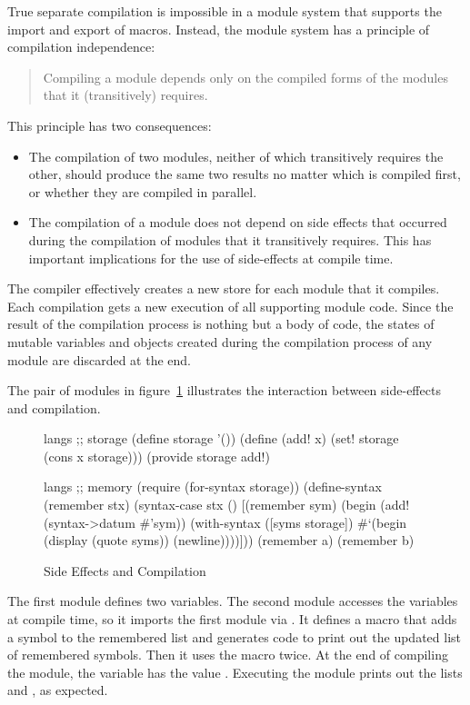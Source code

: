 \begin{schemeregion}
True separate compilation is impossible in a module system that
supports the import and export of macros. Instead, the module system
has a principle of compilation independence:
\begin{quote}
Compiling a module depends only on the compiled forms of the
modules that it (transitively) requires.
\end{quote}
This principle has two consequences:
\begin{itemize}
\item The compilation of two modules, neither of which transitively
  requires the other, should produce the same two results no matter
  which is compiled first, or whether they are compiled in parallel.
\item The compilation of a module does not depend on side effects that
  occurred during the compilation of modules that it transitively
  requires. This has important implications for the use of
  side-effects at compile time.
\end{itemize}

The compiler effectively creates a new store for each module
that it compiles. Each compilation gets a new execution of all
supporting module code.
%
Since the result of the compilation process is nothing but a body of
code, the states of mutable variables and objects created during the
compilation process of any module are discarded at the end.

The pair of modules in figure~\ref{fig:side-effect}
 illustrates the interaction between
side-effects and compilation.
\begin{figure}
\begin{schemedisplay}
langs ;; storage
(define storage '())
(define (add! x) (set! storage (cons x storage)))
(provide storage add!)

langs ;; memory
(require (for-syntax storage))
(define-syntax (remember stx)
  (syntax-case stx ()
    [(remember sym)
     (begin (add! (syntax->datum #'sym))
	    (with-syntax ([syms storage])
              #`(begin (display (quote syms))
		       (newline))))]))
(remember a)
(remember b)
\end{schemedisplay}
\caption{Side Effects and Compilation}
\label{fig:side-effect}
\end{figure}
The first module defines two variables. The second module accesses the
variables at compile time, so it imports the first module via
. It defines a  macro that
adds a symbol to the remembered list and generates code to print out
the updated list of remembered symbols. Then it uses the macro
twice. At the end of compiling the  module, the
 variable has the value . Executing the
 module prints out the lists  and
, as expected.


\end{schemeregion}
